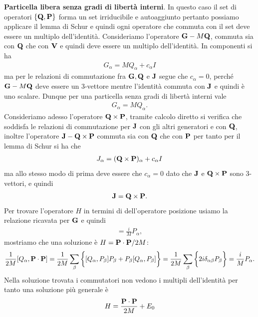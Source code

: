 \textbf{Particella libera senza gradi di libertà interni}.
In questo caso il set di operatori $ \{\mathbf{Q}, \mathbf{P}\} $ forma un set irriducibile e autoaggiunto pertanto possiamo applicare il lemma di Schur e quindi 
ogni operatore che commuta con il set deve essere un multiplo dell'identità. Consideriamo l'operatore $ \mathbf{G} - M\mathbf{Q} $, commuta sia 
con $ \mathbf{Q} $ che con $ \mathbf{V} $ e quindi deve essere un multiplo dell'identità. In componenti si ha
\begin{align*}
  G_\alpha = M Q_\alpha + c_\alpha I
\end{align*}
ma per le relazioni di commutazione fra $ \mathbf{G}, \mathbf{Q} $ e $ \mathbf{J} $ segue che $ c_\alpha = 0 $, perché $ \mathbf{G} - M\mathbf{Q} $ deve essere un 3-vettore 
mentre l'identità commuta con $ \mathbf{J} $ e quindi è uno scalare. Dunque per una particella senza gradi di libertà interni vale 
\begin{align*}
  G_\alpha = M Q_\alpha.
\end{align*}
Consideriamo adesso l'operatore $ \mathbf{Q \times P} $, tramite calcolo diretto si verifica che soddisfa le relazioni di commutazione per $ \mathbf{J} $ con gli 
altri generatori e con $ \mathbf{Q} $, inoltre l'operatore $ \mathbf{J} - \mathbf{Q\times P} $ commuta sia con $ \mathbf{Q} $ che con $ \mathbf{P} $ per tanto per il lemma di 
Schur si ha che 
\begin{align*}
  J_\alpha = (\mathbf{Q\times P})_\alpha + c_\alpha I
\end{align*}
ma allo stesso modo di prima deve essere che $ c_\alpha = 0 $ dato che $ \mathbf{J} $ e $ \mathbf{Q\times P} $ sono 3-vettori, e quindi 
\begin{align*}
  \mathbf{J} = \mathbf{Q\times P}.
\end{align*}
Per trovare l'operatore $ H $ in termini di dell'operatore posizione usiamo la relazione ricavata per $ \mathbf{G} $ e quindi 
\begin{align*}
  [Q_\alpha, H] = \frac{i}{M} P_\alpha,
\end{align*}
mostriamo che una soluzione è $ H = \mathbf{P\cdot P}/2M $:
\begin{align*}
  \frac{1}{2M}[Q_\alpha,\mathbf{P\cdot P} ] = \frac1{2M} \sum_\beta \left\{ \vphantom{\int} [Q_\alpha, P_\beta] P_\beta + P_\beta [Q_\alpha, P_\beta] \right\} 
  = \frac1{2M} \sum_\beta \left\{ \vphantom{\int} 2 i\delta_{\alpha \beta} P_\beta  \right\} = \frac{i}{M} P_\alpha.
\end{align*}
Nella soluzione trovata i commutatori non vedono i multipli dell'identità per tanto una soluzione più generale è 
\begin{align*}
  H = \frac{\mathbf{P\cdot P}}{2M} + E_0
\end{align*}
